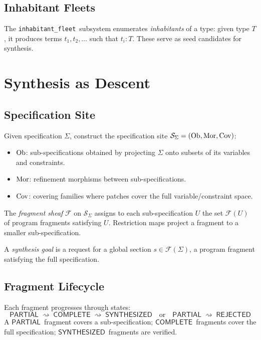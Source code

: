 \documentclass[11pt]{article}
\newcommand{\FragmentSpace}{\mathcal{F}}
\newcommand{\SpecSpace}{\mathcal{S}_\Sigma}
\newcommand{\Synthesized}{\ensuremath{\mathsf{SYNTHESIZED}}}
\newcommand{\Partial}{\ensuremath{\mathsf{PARTIAL}}}
\newcommand{\Complete}{\ensuremath{\mathsf{COMPLETE}}}
\newcommand{\Rejected}{\ensuremath{\mathsf{REJECTED}}}
\newcommand{\InhabFleet}{\texttt{inhabitant\_fleet}}
\newcommand{\syntharrow}{\rightsquigarrow}
\begin{document}
\subsection{Inhabitant Fleets}
The \InhabFleet\ subsystem enumerates \emph{inhabitants} of a type:
given type $T$, it produces terms $t_1, t_2, \ldots$ such that
$t_i : T$.  These serve as seed candidates for synthesis.

\section{Synthesis as Descent}\label{sec:synthesis-site}

\subsection{Specification Site}
Given specification $\Sigma$, construct the specification site
$\SpecSpace = (\Ob, \Mor, \Cov)$:
\begin{itemize}[noitemsep]
  \item $\mathrm{Ob}$: sub-specifications obtained by projecting $\Sigma$
        onto subsets of its variables and constraints.
  \item $\mathrm{Mor}$: refinement morphisms between sub-specifications.
  \item $\mathrm{Cov}$: covering families where patches cover the full
        variable/constraint space.
\end{itemize}

\begin{definition}\label{def:fragment-sheaf}
The \emph{fragment sheaf} $\FragmentSpace$ on $\SpecSpace$ assigns
to each sub-specification $U$ the set $\FragmentSpace(U)$ of
program fragments satisfying $U$.  Restriction maps project a
fragment to a smaller sub-specification.
\end{definition}

\begin{definition}\label{def:synthesis-goal}
A \emph{synthesis goal} is a request for a global section
$s \in \FragmentSpace(\Sigma)$, \ie a program fragment satisfying
the full specification.
\end{definition}

\subsection{Fragment Lifecycle}
Each fragment progresses through states:
\[
  \Partial \;\syntharrow\; \Complete \;\syntharrow\; \Synthesized
  \quad\text{or}\quad
  \Partial \;\syntharrow\; \Rejected
\]
A \Partial\ fragment covers a sub-specification; \Complete\ fragments
cover the full specification; \Synthesized\ fragments are verified.
\end{document}
